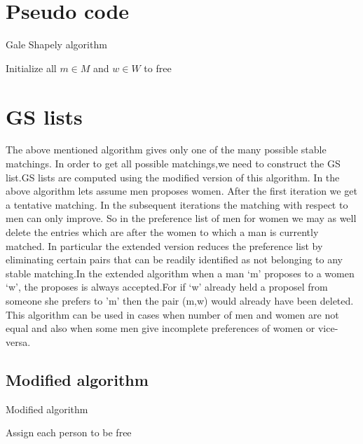\documentclass[a4paper]{report}
\theoremstyle{definition}
\begin{document}
\section{Pseudo code}
\begin{algorithm}
\caption{Gale Shapely algorithm}
Initialize all $m \in M$ and $w \in W$ to free\\
\end{algorithm}
    
\section{GS lists}
The above mentioned algorithm gives only one of the many possible stable matchings. In order to get all possible matchings,we need to construct the GS list.GS lists are computed using the modified version of this algorithm. In the above algorithm lets assume men proposes women. After the first iteration we get a tentative matching.
In the subsequent iterations the matching with respect to men can only improve. So in the preference list of men for women we may as well delete the entries which are after the women to which a man is currently matched. In particular the extended version reduces the preference list by eliminating certain pairs that can be readily identified as not belonging to any stable matching.In the extended algorithm when a man `m' proposes to a women `w', the proposes is always accepted.For if `w' already held a proposel from someone she prefers to 'm' then the pair (m,w) would already have been deleted. This algorithm can be used in cases when number of men and women are not equal and also when some men give incomplete preferences of women or vice-versa.
\subsection{Modified algorithm}
\begin{algorithm}[H]
\caption{Modified algorithm}
Assign each person to be free\\
\end{algorithm}
\end{document}
